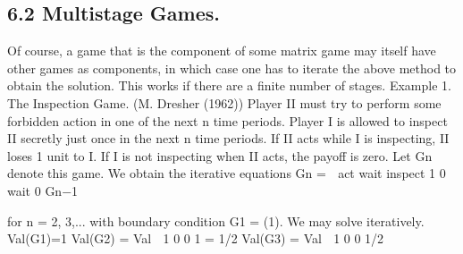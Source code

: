\documentclass[]{report}
\begin{document}
\subsection{6.2 Multistage Games.} Of course, a game that is the component of some matrix
game may itself have other games as components, in which case one has to iterate the
above method to obtain the solution. This works if there are a finite number of stages.
Example 1. The Inspection Game. (M. Dresher (1962)) Player II must try to perform
some forbidden action in one of the next n time periods. Player I is allowed to inspect II
secretly just once in the next n time periods. If II acts while I is inspecting, II loses 1 unit
to I. If I is not inspecting when II acts, the payoff is zero.
Let Gn denote this game. We obtain the iterative equations
Gn =

act wait
inspect 1 0
wait 0 Gn−1

for n = 2, 3,...
with boundary condition G1 = (1). We may solve iteratively.
Val(G1)=1
Val(G2) = Val  1 0
0 1
= 1/2
Val(G3) = Val  1 0
0 1/2
\end{document}
